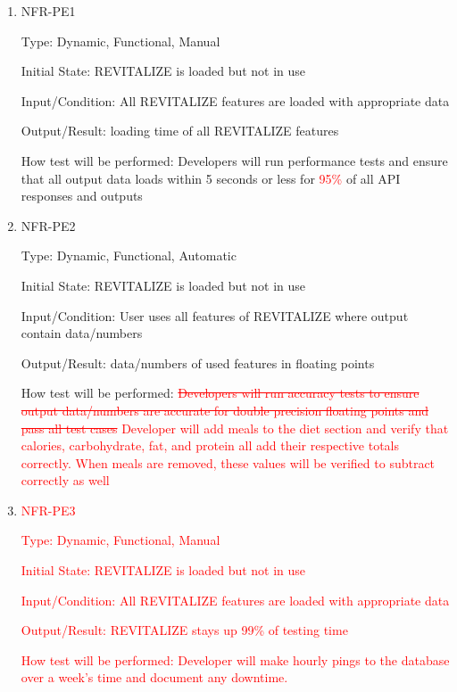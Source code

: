 \documentclass[12pt, titlepage]{article}
\begin{document}
\begin{enumerate}
	
	\item{NFR-PE1\\}
	
	Type: Dynamic, Functional, Manual
	
	Initial State: REVITALIZE is loaded but not in use
	
	Input/Condition: All REVITALIZE features are loaded with appropriate data
	
	Output/Result: loading time of all REVITALIZE features
	
	How test will be performed: Developers will run performance tests and ensure that all output data loads within 5 seconds or less for \textcolor{red}{95\%} of all API responses and outputs
	
	\item{NFR-PE2\\}
	
	Type: Dynamic, Functional, Automatic
	
	Initial State: REVITALIZE is loaded but not in use
	
	Input/Condition: User uses all features of REVITALIZE where output contain data/numbers
	
	Output/Result: data/numbers of used features in floating points
	
	How test will be performed: \textcolor{red}{\sout{Developers will run accuracy tests to ensure output data/numbers are accurate for double precision floating points and pass all test cases}} \textcolor{red}{Developer will add meals to the diet section and verify that calories, carbohydrate, fat, and protein all add their respective totals correctly. When meals are removed, these values will be verified to subtract correctly as well}
	
	\item{\textcolor{red}{NFR-PE3}\\}
	
	\textcolor{red}{Type: Dynamic, Functional, Manual}
	
	\textcolor{red}{Initial State: REVITALIZE is loaded but not in use}

	\textcolor{red}{Input/Condition: All REVITALIZE features are loaded with appropriate data}
	
	\textcolor{red}{Output/Result: REVITALIZE stays up 99\% of testing time}
	
	\textcolor{red}{How test will be performed: Developer will make hourly pings to the database over a week's time and document any downtime.}



\end{enumerate}
\end{document}
